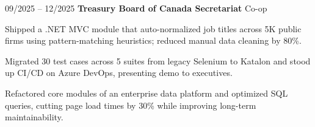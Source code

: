 \begin{twocolentry}{09/2025 – 12/2025} \textbf{Treasury Board of Canada Secretariat}
\newline Co-op \end{twocolentry}
\begin{onecolentry}
\begin{highlights}
\item Shipped a .NET MVC module that auto-normalized job titles across 5K public firms using pattern-matching heuristics; reduced manual data cleaning by 80\%.
\item Migrated 30 test cases across 5 suites from legacy Selenium to Katalon and stood up CI/CD on Azure DevOps, presenting demo to executives.
\item Refactored core modules of an enterprise data platform and optimized SQL queries, cutting page load times by 30\% while improving long-term maintainability.
\end{highlights}
\end{onecolentry}

